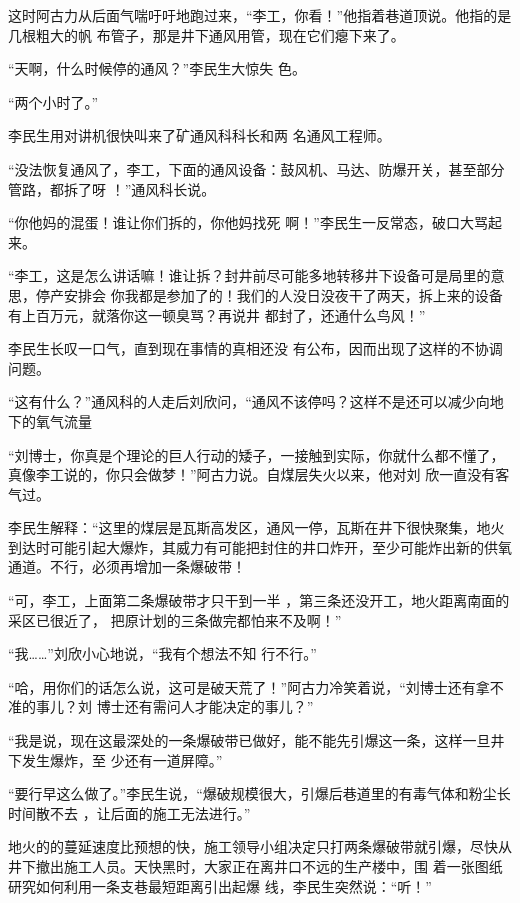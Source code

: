 \documentclass{article}
\begin{document}
\newpage

这时阿古力从后面气喘吁吁地跑过来，“李工，你看！”他指着巷道顶说。他指的是几根粗大的帆
布管子，那是井下通风用管，现在它们瘪下来了。 

“天啊，什么时候停的通风？”李民生大惊失
色。 


“两个小时了。” 

李民生用对讲机很快叫来了矿通风科科长和两
名通风工程师。 

“没法恢复通风了，李工，下面的通风设备：鼓风机、马达、防爆开关，甚至部分管路，都拆了呀
！”通风科长说。 

“你他妈的混蛋！谁让你们拆的，你他妈找死
啊！”李民生一反常态，破口大骂起来。 

“李工，这是怎么讲话嘛！谁让拆？封井前尽可能多地转移井下设备可是局里的意思，停产安排会
\newpage
你我都是参加了的！我们的人没日没夜干了两天，拆上来的设备有上百万元，就落你这一顿臭骂？再说井
都封了，还通什么鸟风！” 

李民生长叹一口气，直到现在事情的真相还没
有公布，因而出现了这样的不协调问题。 

“这有什么？”通风科的人走后刘欣问，“通风不该停吗？这样不是还可以减少向地下的氧气流量

“刘博士，你真是个理论的巨人行动的矮子，一接触到实际，你就什么都不懂了，真像李工说的，你只会做梦！”阿古力说。自煤层失火以来，他对刘
欣一直没有客气过。 

李民生解释：“这里的煤层是瓦斯高发区，通风一停，瓦斯在井下很快聚集，地火到达时可能引起大爆炸，其威力有可能把封住的井口炸开，至少可能炸出新的供氧通道。不行，必须再增加一条爆破带！

“可，李工，上面第二条爆破带才只干到一半
\newpage
，第三条还没开工，地火距离南面的采区已很近了，
把原计划的三条做完都怕来不及啊！” 

“我……”刘欣小心地说，“我有个想法不知
行不行。” 

“哈，用你们的话怎么说，这可是破天荒了！”阿古力冷笑着说，“刘博士还有拿不准的事儿？刘
博士还有需问人才能决定的事儿？” 

“我是说，现在这最深处的一条爆破带已做好，能不能先引爆这一条，这样一旦井下发生爆炸，至
少还有一道屏障。” 

“要行早这么做了。”李民生说，“爆破规模很大，引爆后巷道里的有毒气体和粉尘长时间散不去
，让后面的施工无法进行。” 

地火的的蔓延速度比预想的快，施工领导小组决定只打两条爆破带就引爆，尽快从井下撤出施工人员。天快黑时，大家正在离井口不远的生产楼中，围
\newpage
着一张图纸研究如何利用一条支巷最短距离引出起爆
线，李民生突然说：“听！” 
\end{document}
